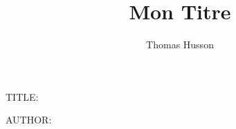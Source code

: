 \documentclass{scrartcl}
\author{Thomas Husson}
\title{Mon Titre}
\begin{document}
TITLE: \hussongettitle

AUTHOR: \hussongetauthor
\end{document}
